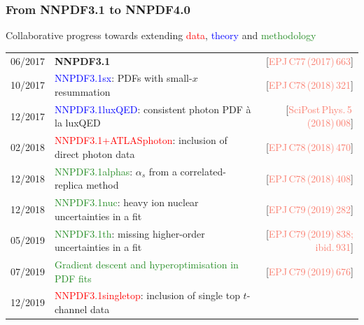 \documentclass{beamer}
\begin{document}
\begin{frame}
 \frametitle{From NNPDF3.1 to NNPDF4.0}
 \footnotesize
 \begin{block}{}
  \centering
  Collaborative progress towards extending {\textcolor{red}{data}}, {\textcolor{blue}{theory}} and {\textcolor{forestgreen}{methodology}}\\
 \end{block}
 \scriptsize
 \renewcommand*{\arraystretch}{1.35}
 \begin{tabularx}{\textwidth}{lXr}
  06/2017 & {\bf NNPDF3.1}                                                              
          & {\tiny{[{\textcolor{salmon}{EPJ\,C77\,(2017)\,663}}]}}\\
  10/2017 & \textcolor{blue}{NNPDF3.1sx}: {\scriptsize PDFs with small-$x$ resummation}                                                
          & {\tiny{[{\textcolor{salmon}{EPJ\,C78\,(2018)\,321}}]}}\\
  12/2017 & \textcolor{blue}{NNPDF3.1luxQED}: {\scriptsize consistent photon PDF \`a la luxQED}                                            
          & {\tiny{[{\textcolor{salmon}{SciPost\,Phys.\,5\,(2018)\,008}}]}}\\
  02/2018 & \textcolor{red}{NNPDF3.1+ATLASphoton}: {\scriptsize inclusion of direct photon data}                                       
          & {\tiny{[{\textcolor{salmon}{EPJ\,C78\,(2018)\,470}}]}}\\
  12/2018 & \textcolor{forestgreen}{NNPDF3.1alphas}: {\scriptsize $\alpha_s$ from a correlated-replica method}                                     
          & {\tiny{[{\textcolor{salmon}{EPJ\,C78\,(2018)\,408}}]}}\\
  12/2018 & \textcolor{forestgreen}{NNPDF3.1nuc}: {\scriptsize heavy ion nuclear uncertainties in a fit}                                        
          & {\tiny{[{\textcolor{salmon}{EPJ\,C79\,(2019)\,282}}]}}\\
  05/2019 & \textcolor{forestgreen}{NNPDF3.1th}: {\scriptsize missing higher-order uncertainties in a fit}                                         
          & {\tiny{[{\textcolor{salmon}{EPJ\,C79\,(2019)\,838; ibid.\,931}}]}}\\
  07/2019 & \textcolor{forestgreen}{Gradient descent and hyperoptimisation in PDF fits} 
          & {\tiny{[{\textcolor{salmon}{EPJ\,C79\,(2019)\,676}}]}}\\
  12/2019 & \textcolor{red}{NNPDF3.1singletop}: {\scriptsize inclusion of single top $t$-channel data}                                          

\end{tabularx}
\end{frame}
\end{document}
